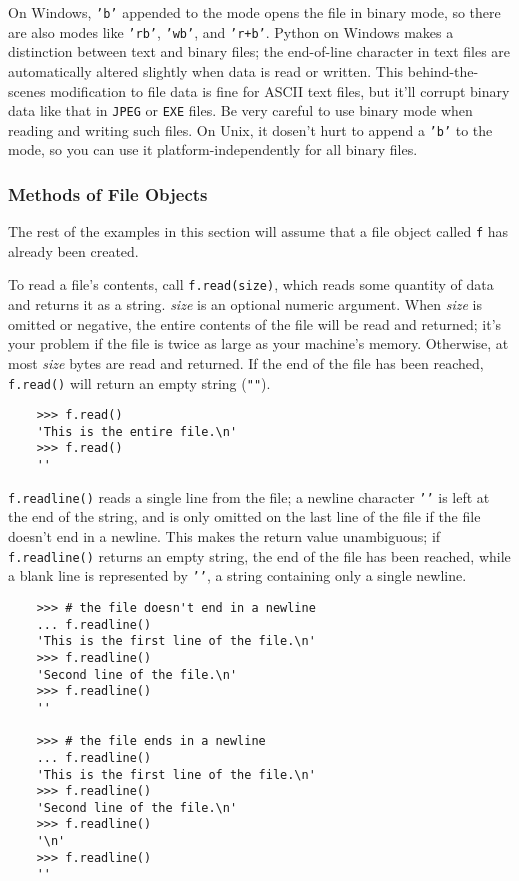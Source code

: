 \documentclass[UTF8]{article}
\begin{document}
On Windows, \texttt{'b'} appended to the mode opens the file in binary mode, so there are also
modes like \texttt{'rb'}, \texttt{'wb'}, and \texttt{'r+b'}. Python on Windows makes a distinction
between text and binary files; the end-of-line character in text files are automatically altered
slightly when data is read or written. This behind-the-scenes modification to file data is fine for
ASCII text files, but it'll corrupt binary data like that in \texttt{JPEG} or \texttt{EXE} files.
Be very careful to use binary mode when reading and writing such files. On Unix, it dosen't hurt to
append a \texttt{'b'} to the mode, so you can use it platform-independently for all binary files.

\subsubsection{Methods of File Objects}
The rest of the examples in this section will assume that a file object called \texttt{f} has
already been created.

To read a file's contents, call \texttt{f.read(size)}, which reads some quantity of
data and returns it as a string. \emph{size} is an optional numeric argument. When \emph{size} is
omitted or negative, the entire contents of the file will be read and returned; it's your problem
if the file is twice as large as your machine's memory. Otherwise, at most \emph{size} bytes are
read and returned. If the end of the file has been reached, \texttt{f.read()} will
return an empty string (\texttt{""}).
\begin{verbatim}
    >>> f.read()
    'This is the entire file.\n'
    >>> f.read()
    ''
\end{verbatim}

\texttt{f.readline()} reads a single line from the file; a newline character
\texttt{'\n'} is left at the end of the string, and is only omitted on the last line of
the file if the file doesn't end in a newline. This makes the return value unambiguous; if
\texttt{f.readline()} returns an empty string, the end of the file has been reached, while a blank
line is represented by \texttt{'\n'}, a string containing only a single newline.
\begin{verbatim}
    >>> # the file doesn't end in a newline
    ... f.readline()
    'This is the first line of the file.\n'
    >>> f.readline()
    'Second line of the file.\n'
    >>> f.readline()
    ''

    >>> # the file ends in a newline
    ... f.readline()
    'This is the first line of the file.\n'
    >>> f.readline()
    'Second line of the file.\n'
    >>> f.readline()
    '\n'
    >>> f.readline()
    ''
\end{verbatim}
\end{document}
